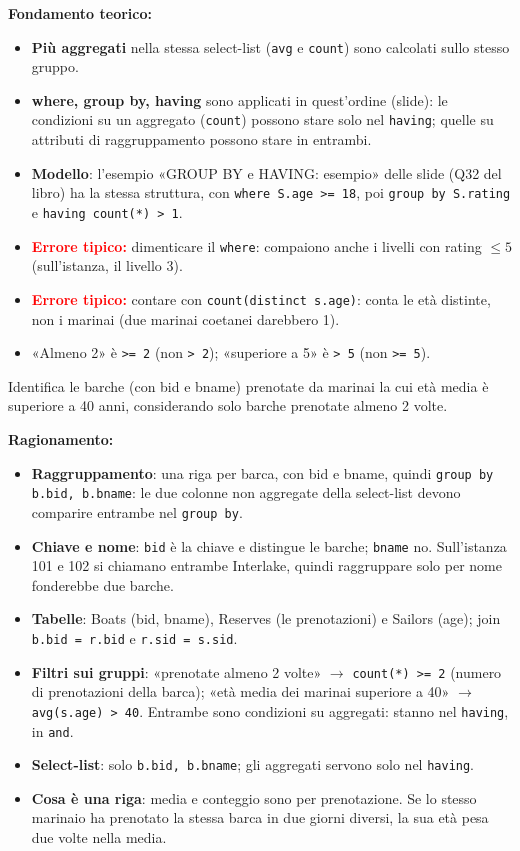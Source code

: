 \documentclass[12pt, a4paper]{article}
\begin{document}
\textbf{Fondamento teorico:}
\begin{itemize}
\item \textbf{Più aggregati} nella stessa select-list (\texttt{avg} e \texttt{count}) sono calcolati sullo stesso gruppo.
\item \textbf{where, group by, having} sono applicati in quest'ordine (slide): le condizioni su un aggregato (\texttt{count}) possono stare solo nel \texttt{having}; quelle su attributi di raggruppamento possono stare in entrambi.
\item \textbf{Modello}: l'esempio «GROUP BY e HAVING: esempio» delle slide (Q32 del libro) ha la stessa struttura, con \texttt{where S.age >= 18}, poi \texttt{group by S.rating} e \texttt{having count(*) > 1}.
\item \textcolor{red}{\textbf{Errore tipico:}} dimenticare il \texttt{where}: compaiono anche i livelli con rating $\le5$ (sull'istanza, il livello 3).
\item \textcolor{red}{\textbf{Errore tipico:}} contare con \texttt{count(distinct s.age)}: conta le età distinte, non i marinai (due marinai coetanei darebbero 1).
\item «Almeno 2» è \texttt{>= 2} (non \texttt{> 2}); «superiore a 5» è \texttt{> 5} (non \texttt{>= 5}).
\end{itemize}

\begin{tcolorbox}[colback=lightergray!10, colframe=tocsec, title=\textbf{Esercizio SQL 5}]
Identifica le barche (con bid e bname) prenotate da marinai la cui età media è superiore a 40 anni, considerando solo barche prenotate almeno 2 volte.
\end{tcolorbox}

\textbf{Ragionamento:}
\begin{itemize}
\item \textbf{Raggruppamento}: una riga per barca, con bid e bname, quindi \texttt{group by b.bid, b.bname}: le due colonne non aggregate della select-list devono comparire entrambe nel \texttt{group by}.
\item \textbf{Chiave e nome}: \texttt{bid} è la chiave e distingue le barche; \texttt{bname} no. Sull'istanza 101 e 102 si chiamano entrambe Interlake, quindi raggruppare solo per nome fonderebbe due barche.
\item \textbf{Tabelle}: Boats (bid, bname), Reserves (le prenotazioni) e Sailors (age); join \texttt{b.bid = r.bid} e \texttt{r.sid = s.sid}.
\item \textbf{Filtri sui gruppi}: «prenotate almeno 2 volte» $\to$ \texttt{count(*) >= 2} (numero di prenotazioni della barca); «età media dei marinai superiore a 40» $\to$ \texttt{avg(s.age) > 40}. Entrambe sono condizioni su aggregati: stanno nel \texttt{having}, in \texttt{and}.
\item \textbf{Select-list}: solo \texttt{b.bid, b.bname}; gli aggregati servono solo nel \texttt{having}.
\item \textbf{Cosa è una riga}: media e conteggio sono per prenotazione. Se lo stesso marinaio ha prenotato la stessa barca in due giorni diversi, la sua età pesa due volte nella media.
\end{itemize}
\end{document}
